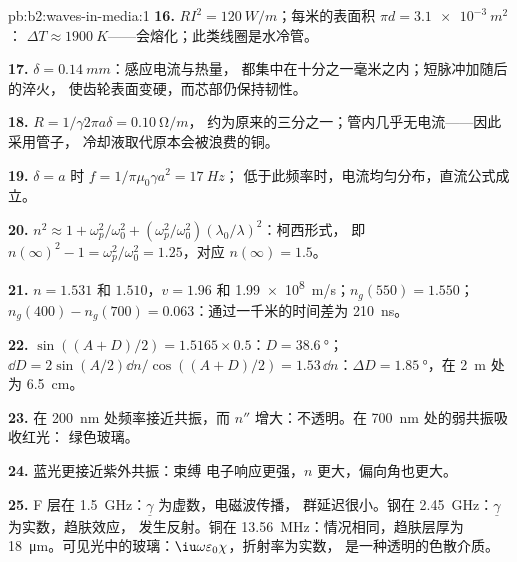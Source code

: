 \begin{solution}{pb:b2:waves-in-media:1}
\textbf{16.} $RI^2 = \qty{120}{W/m}$；每米的表面积 $\pi d = \qty{3.1e-3}{m^2}$：
$\Delta T \approx \qty{1900}{K}$——会熔化；此类线圈是水冷管。

\textbf{17.} $\delta = \qty{0.14}{mm}$：感应电流与热量，
都集中在十分之一毫米之内；短脉冲加随后的淬火，
使齿轮表面变硬，而芯部仍保持韧性。

\textbf{18.} $R = 1/\gamma2\pi a\delta = \qty{0.10}{\ohm/m}$，
约为原来的三分之一；管内几乎无电流——因此采用管子，
冷却液取代原本会被浪费的铜。

\textbf{19.} $\delta = a$ 时 $f = 1/\pi\mu_0\gamma a^2 = \qty{17}{Hz}$；
低于此频率时，电流均匀分布，直流公式成立。

\textbf{20.} $n^2 \approx 1 + \omega_p^2/\omega_0^2 + (\omega_p^2/\omega_0^2)(\lambda_0/\lambda)^2$：柯西形式，
即 $n(\infty)^2 - 1 = \omega_p^2/\omega_0^2 = 1.25$，对应 $n(\infty) = 1.5$。

\textbf{21.} $n = 1.531$ 和 $1.510$，$v = 1.96$ 和 \qty{1.99e8}{m/s}；$n_g(550) =
1.550$；$n_g(400) - n_g(700) = 0.063$：通过一千米的时间差为 \qty{210}{ns}。

\textbf{22.} $\sin((A + D)/2) = 1.5165 \times 0.5$：$D = \qty{38.6}{\degree}$；$\dd D = 2\sin
(A/2)\dd n/\cos((A + D)/2) = 1.53\,\dd n$：$\Delta D = \qty{1.85}{\degree}$，在 \qty{2}{m} 处为 \qty{6.5}{cm}。

\textbf{23.} 在 \qty{200}{nm} 处频率接近共振，而
$n''$ 增大：不透明。在 \qty{700}{nm} 处的弱共振吸收红光：
绿色玻璃。

\textbf{24.} 蓝光更接近紫外共振：束缚
电子响应更强，$n$ 更大，偏向角也更大。

\textbf{25.} F 层在 \qty{1.5}{GHz}：$\underline\gamma$ 为虚数，电磁波传播，
群延迟很小。钢在 \qty{2.45}{GHz}：$\underline\gamma$ 为实数，趋肤效应，
发生反射。铜在 \qty{13.56}{MHz}：情况相同，趋肤层厚为
\qty{18}{\micro m}。可见光中的玻璃：$\iu\omega\varepsilon_0\chi$，折射率为实数，
是一种透明的色散介质。
\end{solution}
